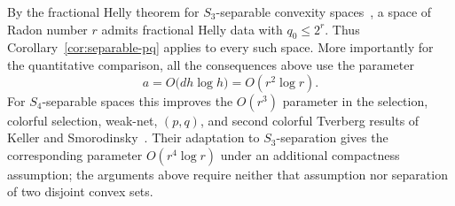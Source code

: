 \documentclass[11pt]{article}
\theoremstyle{definition}
\begin{document}
By the fractional Helly theorem for $S_3$-separable convexity
spaces~\cite{holmsen2024helly}, a space of Radon number $r$ admits
fractional Helly data with $q_0\le 2^r$.  Thus
Corollary~\ref{cor:separable-pq} applies to every such space.  More
importantly for the quantitative comparison, all the consequences
above use the parameter
\[
a=O\bigl(dh\log h\bigr)
=
O(r^2\log r).
\]
For $S_4$-separable spaces this improves the $O(r^3)$ parameter in
the selection, colorful selection, weak-net, $(p,q)$, and second
colorful Tverberg results of Keller and
Smorodinsky~\cite{keller2026colorful}.  Their adaptation to
$S_3$-separation gives the corresponding parameter
$O(r^4\log r)$ under an additional compactness assumption; the
arguments above require neither that assumption nor separation of two
disjoint convex sets.
\end{document}
